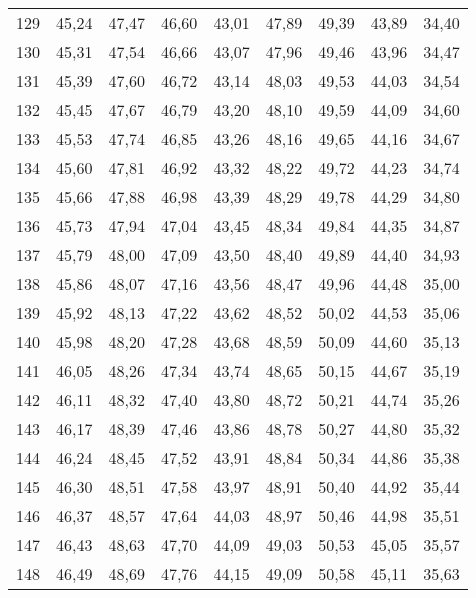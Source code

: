 \begin{longtable}{c c c c c c c c c}
      129	& 45,24	& 47,47	& 46,60	& 43,01	& 47,89	& 49,39	& 43,89	& 34,40 \\
      130	& 45,31	& 47,54	& 46,66	& 43,07	& 47,96	& 49,46	& 43,96	& 34,47 \\
      131	& 45,39	& 47,60	& 46,72	& 43,14	& 48,03	& 49,53	& 44,03	& 34,54 \\
      132	& 45,45	& 47,67	& 46,79	& 43,20	& 48,10	& 49,59	& 44,09	& 34,60 \\
      133	& 45,53	& 47,74	& 46,85	& 43,26	& 48,16	& 49,65	& 44,16	& 34,67 \\
      134	& 45,60	& 47,81	& 46,92	& 43,32	& 48,22	& 49,72	& 44,23	& 34,74 \\
      135	& 45,66	& 47,88	& 46,98	& 43,39	& 48,29	& 49,78	& 44,29	& 34,80 \\
      136	& 45,73	& 47,94	& 47,04	& 43,45	& 48,34	& 49,84	& 44,35	& 34,87 \\
      137	& 45,79	& 48,00	& 47,09	& 43,50	& 48,40	& 49,89	& 44,40	& 34,93 \\
      138	& 45,86	& 48,07	& 47,16	& 43,56	& 48,47	& 49,96	& 44,48	& 35,00 \\
      139	& 45,92	& 48,13	& 47,22	& 43,62	& 48,52	& 50,02	& 44,53	& 35,06 \\
      140	& 45,98	& 48,20	& 47,28	& 43,68	& 48,59	& 50,09	& 44,60	& 35,13 \\
      141	& 46,05	& 48,26	& 47,34	& 43,74	& 48,65	& 50,15	& 44,67	& 35,19 \\
      142	& 46,11	& 48,32	& 47,40	& 43,80	& 48,72	& 50,21	& 44,74	& 35,26 \\
      143	& 46,17	& 48,39	& 47,46	& 43,86	& 48,78	& 50,27	& 44,80	& 35,32 \\
      144	& 46,24	& 48,45	& 47,52	& 43,91	& 48,84	& 50,34	& 44,86	& 35,38 \\
      145	& 46,30	& 48,51	& 47,58	& 43,97	& 48,91	& 50,40	& 44,92	& 35,44 \\
      146	& 46,37	& 48,57	& 47,64	& 44,03	& 48,97	& 50,46	& 44,98	& 35,51 \\
      147	& 46,43	& 48,63	& 47,70	& 44,09	& 49,03	& 50,53	& 45,05	& 35,57 \\
      148	& 46,49	& 48,69	& 47,76	& 44,15	& 49,09	& 50,58	& 45,11	& 35,63 \\
      \bottomrule
    \end{longtable}


